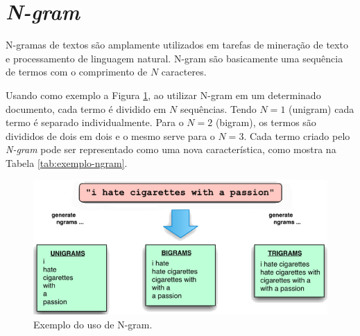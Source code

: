 \section{{\it N-gram}}\label{sec:ngram}
N-gramas de textos são amplamente utilizados em tarefas de mineração de texto e processamento de linguagem natural.  N-gram são basicamente uma sequência de termos com o comprimento de $N$ caracteres. 

Usando como exemplo a Figura \ref{fig:exemplo-ngram}, ao utilizar N-gram em um determinado documento, cada termo é dividido em $N$ sequências. Tendo $N=1$ (unigram) cada termo é separado individualmente. Para o $N=2$ (bigram), os termos são divididos de dois em dois e o mesmo serve para o $N=3$. Cada termo criado pelo \textit{N-gram} pode ser representado como uma nova característica, como mostra na Tabela \ref{tab:exemplo-ngram}.  

\begin{figure}[ht]
  \centering
  \includegraphics[height=0.3\textheight]{figuras/exemplos/ngram-exemplo.png}
  \caption{Exemplo do uso de N-gram. \cite{exemplongram}}
  \label{fig:exemplo-ngram}
\end{figure}


\begin{table}[h]
\caption{Exemplo de características utilizando N-gram.}\label{tab:exemplo-ngram}
\end{table}


